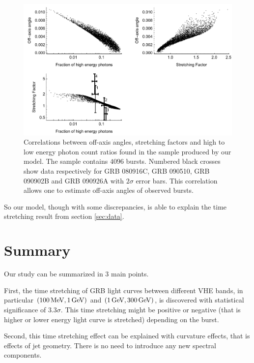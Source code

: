 \documentclass[11pt,a4paper]{article}
\begin{document}
\begin{figure}
        \centering
        \includegraphics[width=1.0\textwidth]{correlations}
        \caption{
        	Correlations between off-axis angles, stretching factors and high to low energy photon count ratios found in the sample produced by our model.
        	The sample contains $4096$ bursts.
        	Numbered black crosses show data respectively for GRB 080916C, GRB 090510, GRB 090902B and GRB 090926A with $2\sigma$ error bars.
        	This correlation allows one to estimate off-axis angles of observed bursts.
        }
        \label{fig:correlations}
\end{figure}

So our model, though with some discrepancies, is able to explain the time stretching result from section \ref{sec:data}.

\section{Summary}

\label{sec:summary}
	
Our study can be summarized in 3 main points.

First, the time stretching of GRB light curves between different VHE bands, in particular $(\unit[100]{MeV}, \unit[1]{GeV})$ and $(\unit[1]{GeV}, \unit[300]{GeV})$, is discovered with statistical significance of $3.3\sigma$.
This time stretching might be positive or negative (that is higher or lower energy light curve is stretched) depending on the burst.

Second, this time stretching effect can be explained with curvature effects, that is effects of jet geometry.
There is no need to introduce any new spectral components.
\end{document}
